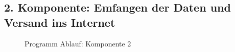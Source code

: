 \newpage

\subsection{2. Komponente: Emfangen der Daten und Versand ins Internet} \label{Empfänger}

\begin{center}
	\begin{figure}[h]
	 
	 \noindent{}
	 \caption[PAP komponente 2]{Programm Ablauf: Komponente 2}
	 \label{fig:lorareadwifisend}
	\end{figure}
\end{center}

